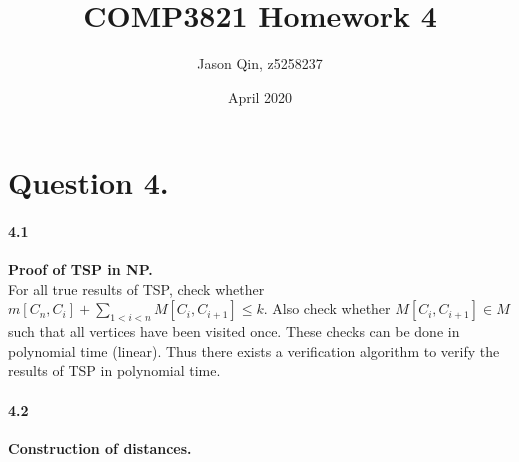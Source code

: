 \documentclass{article}
\title{COMP3821 Homework 4}
\author{Jason Qin, z5258237}
\date{April 2020}
\begin{document}
\maketitle

\section*{Question 4.}
\paragraph*{4.1} \textbf{Proof of TSP in NP.} \\

\noindent
For all true results of TSP, check whether $m[C_n, C_i] + \sum_{1<i<n} M[C_i, C_{i+1}] \leq k$.
Also check whether $M[C_i, C_{i+1}] \in M$ such that all vertices have been visited once.
These checks can be done in polynomial time (linear). Thus there exists a verification algorithm
to verify the results of TSP in polynomial time.

\paragraph*{4.2} \textbf{Construction of distances.} \\

\noindent
\end{document}
